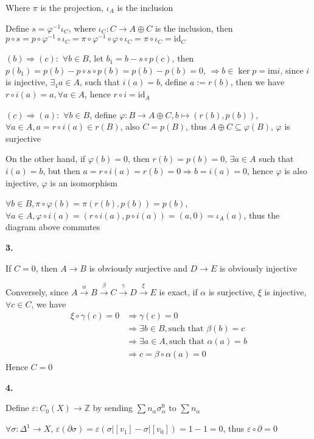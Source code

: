 \documentclass[12pt]{article}
\begin{document}
Where $\pi$ is the projection, $\iota_A$ is the inclusion \par
Define $s=\varphi^{-1}\iota_C$, where $\iota_C: C\rightarrow A\oplus C$ is the inclusion, then $p\circ s=p\circ\varphi^{-1}\circ\iota_C=\pi\circ\varphi^{-1}\circ\varphi\circ\iota_C=\pi\circ\iota_C=\mathrm{id}_C$ \par
$(b)\Rightarrow (c):$ $\forall b\in B$, let $b_1=b-s\circ p(c)$, then $p(b_1)=p(b)-p\circ s\circ p(b)=p(b)-p(b)=0$, $\Rightarrow b\in\ker p=\mathrm{im} i$, since $i$ is injective, $\exists_1 a\in A$, such that $i(a)=b$, define $a:=r(b)$, then we have $r\circ i(a)=a, \forall a\in A$, hence $r\circ i=\mathrm{id}_A$ \par
$(c)\Rightarrow (a):$ $\forall b\in B$, define $\varphi: B\rightarrow A\oplus C, b\mapsto (r(b),p(b))$, $\forall a\in A, a=r\circ i(a)\in r(B)$, also $C=p(B)$, thus $A\oplus C\subseteq\varphi(B)$, $\varphi$ is surjective \par
On the other hand, if $\varphi(b)=0$, then $r(b)=p(b)=0$, $\exists a\in A$ such that $i(a)=b$, but then $a=r\circ i(a)=r(b)=0\Rightarrow b=i(a)=0$, hence $\varphi$ is also injective, $\varphi$ is an isomorphism \par
$\forall b\in B, \pi\circ\varphi(b)=\pi(r(b),p(b))=p(b)$, $\forall a\in A, \varphi\circ i(a)=(r\circ i(a),p\circ i(a))=(a,0)=\iota_A(a)$, thus the diagram above commutes \par
\textbf{3.} \par
If $C=0$, then $A\rightarrow B$ is obviously surjective and $D\rightarrow E$ is obviously injective \par
Conversely, since $A\xrightarrow{\alpha}B\xrightarrow{\beta}C\xrightarrow{\gamma}D\xrightarrow{\xi}E$ is exact, if $\alpha$ is surjective, $\xi$ is injective, $\forall c\in C$, we have 
\[
\begin{aligned}
\xi\circ\gamma(c)=0
&\Rightarrow \gamma(c)=0 \\
&\Rightarrow \exists b\in B, \text{such that } \beta(b)=c \\
&\Rightarrow \exists a\in A, \text{such that } \alpha(a)=b \\
&\Rightarrow c=\beta\circ\alpha(a)=0
\end{aligned}
\]
Hence $C=0$ \par
\textbf{4.} \par
Define $\varepsilon: C_0(X)\rightarrow \mathbb{Z}$ by sending $\sum n_\alpha\sigma^0_\alpha$ to $\sum n_\alpha$ \par
$\forall \sigma: \Delta^1\rightarrow X$, $\varepsilon(\partial\sigma)=\varepsilon\left(\sigma|[v_1]-\sigma|[v_0]\right)=1-1=0$, thus $\varepsilon\circ\partial=0$ \par
\end{document}
